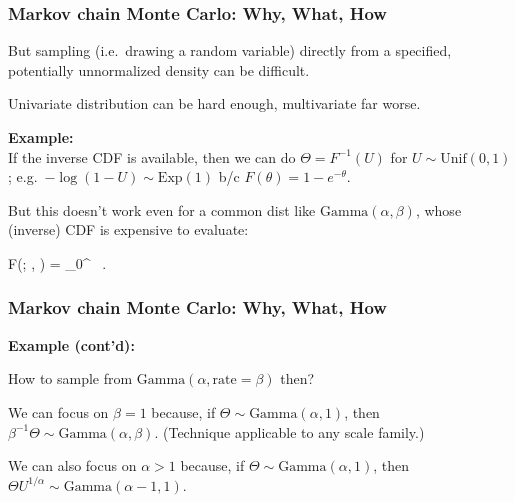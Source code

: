 \documentclass[18pt]{beamer}
\newcommand{\defineTightSpacing}{%
	\setlength{\abovedisplayskip}{.3\baselineskip}%
	\setlength{\belowdisplayskip}{.3\baselineskip}%
}
\newenvironment{tightEquation*}{%
	\defineTightSpacing%
	\begin{equation*}
}{
	\end{equation*} \ignorespacesafterend
}
\newcommand{\smallCap}[1]{{\small \MakeUppercase{#1}}}
\newcommand{\unifDist}{\mathrm{Unif}}
\newcommand{\param}{\theta}
\newcommand{\randVar}{\Theta}
\begin{document}
\newcommand{\frametitleText}{Markov chain Monte Carlo: Why\textcolor{greyedOutThemecolor}{, What, How}}
\begin{frame}
\frametitle{\frametitleText}

But sampling (i.e.\ drawing a random variable) directly from a specified, potentially unnormalized density can be difficult.
\smallskip

Univariate distribution can be hard enough, multivariate far worse.
\medskip

\pause
\textbf{Example:}\\
If the inverse \smallCap{cdf} is available, then we can do $\randVar = F^{-1}(U)$ for $U \sim \unifDist(0, 1)$;
e.g.\ $- \log (1 - U) \sim \mathrm{Exp}(1)$ b/c $F(\theta) = 1 - e^{-\theta}$.
\smallskip

\pause
But this doesn't work even for a common dist like $\textrm{Gamma}(\alpha, \beta)$, whose (inverse) \smallCap{cdf}  is expensive to evaluate:
\begin{tightEquation*}
F(\param; \alpha, \beta) = 
	\int_0^\param \frac{\beta^\alpha \tilde{\param}^{\alpha-1} e^{-\beta \tilde{\param}}}{\Gamma(\alpha)} \,  \tilde{\param}.
\end{tightEquation*}

\end{frame}


\begin{frame}
\frametitle{\frametitleText}

\textbf{Example {\normalfont (cont'd)}:}\\
\medskip

How to sample from $\textrm{Gamma}(\alpha, \mathrm{rate} =  \beta)$ then? 
\smallskip

\pause
We can focus on $\beta = 1$ because, if $\randVar \sim \textrm{Gamma}(\alpha, 1)$, then $\beta^{-1} \randVar \sim \textrm{Gamma}(\alpha, \beta)$.
(Technique applicable to any scale family.)%
\smallskip

\pause
We can also focus on $\alpha > 1$ because,  if $\randVar \sim \textrm{Gamma}(\alpha, 1)$, then
$\randVar U^{1/\alpha} \sim \textrm{Gamma}(\alpha - 1, 1)$.

\end{frame}
\end{document}
